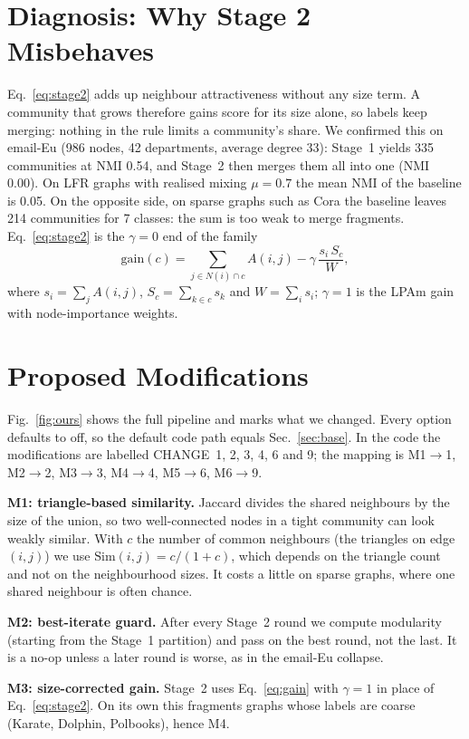 \documentclass[conference]{IEEEtran}
\begin{document}
\section{Diagnosis: Why Stage 2 Misbehaves}\label{sec:diag}
Eq.~\eqref{eq:stage2} adds up neighbour attractiveness without any size term. A community that grows therefore gains score for its size alone, so labels keep merging: nothing in the rule limits a community's share. We confirmed this on email-Eu (986 nodes, 42 departments, average degree 33): Stage~1 yields 335 communities at NMI 0.54, and Stage~2 then merges them all into one (NMI 0.00). On LFR graphs with realised mixing $\mu{=}0.7$ the mean NMI of the baseline is 0.05. On the opposite side, on sparse graphs such as Cora the baseline leaves 214 communities for 7 classes: the sum is too weak to merge fragments. Eq.~\eqref{eq:stage2} is the $\gamma{=}0$ end of the family
\begin{equation}
\mathrm{gain}(c)=\sum_{j\in N(i)\cap c}A(i,j)-\gamma\,\frac{s_i\,S_c}{W},\label{eq:gain}
\end{equation}
where $s_i=\sum_j A(i,j)$, $S_c=\sum_{k\in c}s_k$ and $W=\sum_i s_i$; $\gamma{=}1$ is the LPAm gain~\cite{barber2009} with node-importance weights.

\section{Proposed Modifications}\label{sec:method}
Fig.~\ref{fig:ours} shows the full pipeline and marks what we changed. Every option defaults to off, so the default code path equals Sec.~\ref{sec:base}. In the code the modifications are labelled CHANGE~1, 2, 3, 4, 6 and 9; the mapping is M1$\to$1, M2$\to$2, M3$\to$3, M4$\to$4, M5$\to$6, M6$\to$9.

\textbf{M1: triangle-based similarity.} Jaccard divides the shared neighbours by the size of the union, so two well-connected nodes in a tight community can look weakly similar. With $c$ the number of common neighbours (the triangles on edge $(i,j)$) we use $\mathrm{Sim}(i,j)=c/(1+c)$, which depends on the triangle count and not on the neighbourhood sizes. It costs a little on sparse graphs, where one shared neighbour is often chance.

\textbf{M2: best-iterate guard.} After every Stage~2 round we compute modularity (starting from the Stage~1 partition) and pass on the best round, not the last. It is a no-op unless a later round is worse, as in the email-Eu collapse.

\textbf{M3: size-corrected gain.} Stage~2 uses Eq.~\eqref{eq:gain} with $\gamma{=}1$ in place of Eq.~\eqref{eq:stage2}. On its own this fragments graphs whose labels are coarse (Karate, Dolphin, Polbooks), hence M4.
\end{document}
